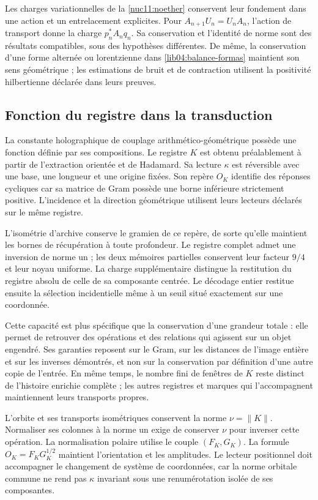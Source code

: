 Les charges variationnelles de la \cref{nuc11:noether} conservent leur
fondement dans une action et un entrelacement explicites. Pour
\(A_{n+1}U_n=U_nA_n\), l’action de transport donne la charge
\(p_n^*A_nq_n\). Sa conservation et l’identité de norme sont des
résultats compatibles, sous des hypothèses différentes. De même,
la conservation d’une forme alternée ou lorentzienne dans
\eqref{lib04:balance-formas} maintient son sens géométrique ;
les estimations de bruit et de contraction utilisent la positivité
hilbertienne déclarée dans leurs preuves.

\subsection{Fonction du registre dans la transduction}
\label{lib06:registro}

La constante holographique de couplage arithmético-géométrique possède une fonction définie par ses compositions. Le registre \(K\) est obtenu préalablement à partir de l'extraction orientée et de Hadamard. Sa lecture \(\kappa\) est réversible avec une base, une longueur et une origine fixées. Son repère \(O_K\) identifie des réponses cycliques car sa matrice de Gram possède une borne inférieure strictement positive. L'incidence et la direction géométrique utilisent leurs lecteurs déclarés sur le même registre.

L’isométrie d’archive conserve le gramien de ce repère, de sorte qu’elle
maintient les bornes de récupération à toute profondeur. Le
registre complet admet une inversion de norme un ; les deux mémoires
partielles conservent leur facteur \(9/4\) et leur noyau uniforme. La
charge supplémentaire distingue la restitution du registre absolu de
celle de sa composante centrée. Le décodage entier restitue
ensuite la sélection incidentielle même à un seuil situé
exactement sur une coordonnée.

Cette capacité est plus spécifique que la conservation d’une grandeur totale :
elle permet de retrouver des opérations et des relations qui agissent sur un
objet engendré. Ses garanties reposent sur le Gram, sur les
distances de l’image entière et sur les inverses démontrés, et non
sur la conservation par définition d’une autre copie de l’entrée. En même temps,
le nombre fini de fenêtres de \(K\) reste distinct de
l’histoire enrichie complète ; les autres registres et marques
qui l’accompagnent maintiennent leurs transports propres.

L’orbite et ses transports isométriques conservent la norme
\(\nu=\|K\|\). Normaliser ses colonnes à la norme un exige de
conserver \(\nu\) pour inverser cette opération. La normalisation
polaire utilise le couple
\((F_K,G_K)\). La formule
\(O_K=F_KG_K^{1/2}\) maintient l’orientation et les amplitudes.
Le lecteur positionnel doit accompagner le changement de système de coordonnées, car la
norme orbitale commune ne rend pas \(\kappa\) invariant sous une
renumérotation isolée de ses composantes.

